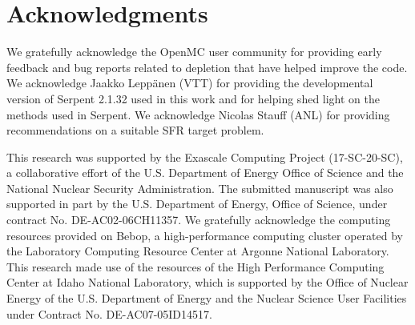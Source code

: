 \documentclass[3p,authoryear]{elsarticle}
\begin{document}
\section*{Acknowledgments}

We gratefully acknowledge the OpenMC user community for providing early feedback
and bug reports related to depletion that have helped improve the code. We
acknowledge Jaakko Lepp{\"{a}}nen (VTT) for providing the developmental
version of Serpent 2.1.32 used in this work and for helping shed light on the
methods used in Serpent. We acknowledge Nicolas Stauff (ANL) for providing
recommendations on a suitable SFR target problem.

This research was supported by the Exascale Computing Project (17-SC-20-SC), a
collaborative effort of the U.S. Department of Energy Office of Science and the
National Nuclear Security Administration. The submitted manuscript was also
supported in part by the U.S. Department of Energy, Office of Science, under
contract No. \mbox{DE-AC02-06CH11357}. We gratefully acknowledge the computing
resources provided on Bebop, a high-performance computing cluster operated by
the Laboratory Computing Resource Center at Argonne National Laboratory. This
research made use of the resources of the High Performance Computing Center at
Idaho National Laboratory, which is supported by the Office of Nuclear Energy of
the U.S. Department of Energy and the Nuclear Science User Facilities under
Contract No. \mbox{DE-AC07-05ID14517}.





\clearpage
\vspace*{\fill}
\noindent{}
\vspace*{\fill}
\end{document}
